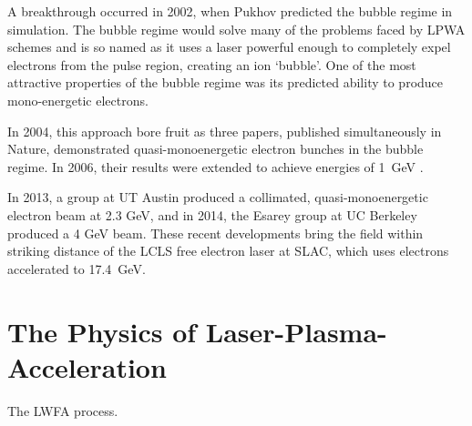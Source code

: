 \documentclass[12pt,letter]{article}
\begin{document}
 A breakthrough occurred in 2002, when Pukhov
 predicted the bubble regime in
 simulation\cite{pukhov2002laser}. The bubble regime would solve many of the
 problems faced by LPWA schemes and is so
 named as it uses a laser powerful enough to
 completely expel electrons from the pulse region, creating an ion `bubble'. One
 of the most attractive properties of the bubble regime was its predicted ability to
 produce mono-energetic electrons. 

 In 2004, this approach bore fruit as three papers, published simultaneously in
 Nature\cite{mangles2004monoenergetic,faure2004laser,Geddes2004}, demonstrated
 quasi-monoenergetic electron bunches in the bubble regime. In 2006, their results were
 extended to achieve energies of \SI{1}{\giga\electronvolt}
 \cite{Leemans2006}. 
 
 In 2013, a group at UT Austin produced a collimated, quasi-monoenergetic
 electron beam at 2.3 GeV\cite{Wang2013}, and in 2014, the Esarey group at UC
 Berkeley produced a 4 GeV\cite{PhysRevLett.113.245002} beam. These recent
 developments bring the field within striking distance of the LCLS free electron
 laser at SLAC,
 which uses electrons accelerated to \SI{17.4}{\giga\electronvolt}\cite{cornacchia2000coherent}.

\section{The Physics of Laser-Plasma-Acceleration}
\begin{marginfigure}
\caption{\label{fig:flow}The LWFA process. }
\end{marginfigure}
   
\end{document}

